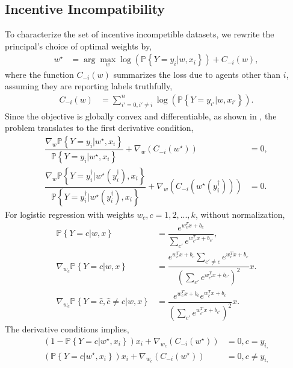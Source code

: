 \documentclass{article}
\begin{document}
\subsection{Incentive Incompatibility}
To characterize the set of incentive incompetible datasets, we rewrite the principal's choice of optimal weights by,
\begin{align*}
w^\star  &= \arg\displaystyle\max_{w} \log\left(\mathbb{P}\left\{Y = y_{i} | w, x_{i}\right\}\right) + C_{-i}\left(w\right),
\end{align*}
where the function $C_{-i}\left(w\right)$ summarizes the loss due to agents other than $i $, assuming they are reporting labels truthfully,
\begin{align*}
C_{-i}\left(w\right) &= \displaystyle\sum_{i' = 0, i' \neq  i}^{n} \log\left(\mathbb{P}\left\{Y = y_{i'} | w, x_{i'}\right\}\right).
\end{align*}
Since the objective is globally convex and differentiable, as shown in , the problem translates to the first derivative condition,
\begin{align*}
\dfrac{\nabla _{w} \mathbb{P}\left\{Y = y_{i} | w^\star , x_{i}\right\}}{\mathbb{P}\left\{Y = y_{i} | w^\star , x_{i}\right\}} + \nabla _{w} \left(C_{-i}\left(w^\star \right)\right) &= 0,
\\ \dfrac{\nabla _{w} \mathbb{P}\left\{Y = y^{\dagger}_{i} | w^\star \left(y^{\dagger}_{i}\right), x_{i}\right\}}{\mathbb{P}\left\{Y = y^{\dagger}_{i} | w^\star \left(y^{\dagger}_{i}\right), x_{i}\right\}} + \nabla _{w} \left(C_{-i}\left(w^\star \left(y^{\dagger}_{i}\right)\right)\right) &= 0.
\end{align*}
For logistic regression with weights $w_{c}, c = 1, 2, ..., k $, without normalization,
\begin{align*}
\mathbb{P}\left\{Y = c | w, x\right\} &= \dfrac{e^{w_{c}^{T} x + b_{c}}}{\displaystyle\sum_{c'} e^{w_{c'}^{T} x + b_{c'}}},
\\ \nabla _{w_{c}} \mathbb{P}\left\{Y = c | w, x\right\} &= \dfrac{e^{w_{c}^{T} x + b_{c}} \displaystyle\sum_{c' \neq  c} e^{w_{c}^{T} x + b_{c}}}{\left(\displaystyle\sum_{c'} e^{w_{c'}^{T} x + b_{c'}}\right)^{2}} x.
\\ \nabla _{w_{c}} \mathbb{P}\left\{Y = \hat{c}, \hat{c} \neq  c | w, x\right\} &= \dfrac{e^{w_{c}^{T} x + b_{c}} e^{w_{\hat{c}}^{T} x + b_{\hat{c}}}}{\left(\displaystyle\sum_{c'} e^{w_{c'}^{T} x + b_{c'}}\right)^{2}} x.
\end{align*}
The derivative conditions implies,
\begin{align*}
\left(1 - \mathbb{P}\left\{Y = c | w^\star , x_{i}\right\}\right) x_{i} + \nabla _{w_{c}} \left(C_{-i}\left(w^\star \right)\right) &= 0, c = y_{i,}
\\ \left(\mathbb{P}\left\{Y = c | w^\star , x_{i}\right\}\right) x_{i} + \nabla _{w_{c}} \left(C_{-i}\left(w^\star \right)\right) &= 0, c \neq  y_{i,}
\end{align*}
\end{document}
